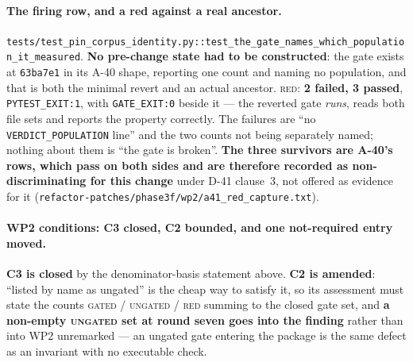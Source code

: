 \documentclass[
  10pt,
]{article}
\begin{document}
\paragraph{The firing row, and a red against a real ancestor.}
\texttt{tests/\allowbreak{}test\_pin\_corpus\_identity.py::\allowbreak{}test\_the\_gate\_names\_which\_population\_it\_measured}. \textbf{No pre-change state had to be constructed}: the gate exists at \texttt{63ba7e1} in its A-40 shape, reporting one count and naming no population, and that is both the minimal revert and an actual ancestor. \textsc{red}: \textbf{2 failed, 3 passed}, \texttt{PYTEST\_EXIT:1}, with \texttt{GATE\_EXIT:0} beside it --- the reverted gate \emph{runs}, reads both file sets and reports the property correctly. The failures are ``no \texttt{VERDICT\_POPULATION} line'' and the two counts not being separately named; nothing about them is ``the gate is broken''. \textbf{The three survivors are A-40's rows, which pass on both sides and are therefore recorded as non-discriminating for this change} under D-41 clause~3, not offered as evidence for it (\texttt{refactor-patches/\allowbreak{}phase3f/wp2/\allowbreak{}a41\_red\_capture.txt}).

\paragraph{WP2 conditions: C3 closed, C2 bounded, and one not-required entry moved.}
\textbf{C3 is closed} by the denominator-basis statement above. \textbf{C2 is amended}: ``listed by name as ungated'' is the cheap way to satisfy it, so its assessment must state the counts \textsc{gated} / \textsc{ungated} / \textsc{red} summing to the closed gate set, and \textbf{a non-empty \textsc{ungated} set at round seven goes into the finding} rather than into WP2 unremarked --- an ungated gate entering the package is the same defect as an invariant with no executable check.
\end{document}
